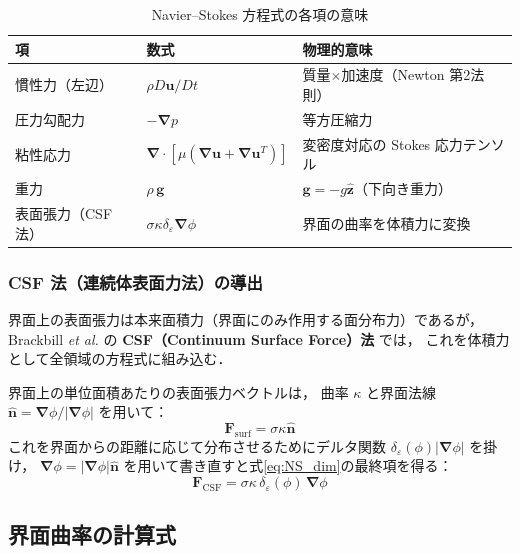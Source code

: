 \documentclass[12pt, a4paper, titlepage]{article}
\newcommand{\jp}[1]{{\normalfont\jpfont #1}}
\newcommand{\bu}{\bm{u}}
\newcommand{\bg}{\bm{g}}
\newcommand{\bnabla}{\bm{\nabla}}
\newcommand{\de}{\delta_\varepsilon}
\begin{document}
\begin{table}[h]
\centering
\caption{\jp{Navier--Stokes 方程式の各項の意味}}
\label{tab:NS_terms}
\begin{tabular}{lll}
\toprule
\jp{項} & \jp{数式} & \jp{物理的意味}\\
\midrule
\jp{慣性力（左辺）} & $\rho D\bu/Dt$ & \jp{質量}$\times$\jp{加速度（Newton 第2法則）}\\
\jp{圧力勾配力} & $-\bnabla p$ & \jp{等方圧縮力}\\
\jp{粘性応力} & $\bnabla\cdot[\mu(\bnabla\bu+\bnabla\bu^T)]$ & \jp{変密度対応の Stokes 応力テンソル}\\
\jp{重力} & $\rho\,\bg$ & \jp{$\bg = -g\hat{\bm{z}}$（下向き重力）}\\
\jp{表面張力（CSF法）} & $\sigma\kappa\de\bnabla\phi$ & \jp{界面の曲率を体積力に変換 \cite{Brackbill1992}}\\
\bottomrule
\end{tabular}
\end{table}

\subsubsection{CSF \jp{法（連続体表面力法）の導出}}

\jp{界面上の表面張力は本来面積力（界面にのみ作用する面分布力）であるが，
Brackbill \textit{et al.} \cite{Brackbill1992} の \textbf{CSF（Continuum Surface Force）法} では，
これを体積力として全領域の方程式に組み込む．}

\jp{界面上の単位面積あたりの表面張力ベクトルは，
曲率 $\kappa$ と界面法線 $\hat{\bm{n}} = \bnabla\phi/|\bnabla\phi|$ を用いて：}
\begin{equation}
  \bm{F}_{\mathrm{surf}} = \sigma\kappa\hat{\bm{n}}
\end{equation}
\jp{これを界面からの距離に応じて分布させるためにデルタ関数 $\de(\phi)|\bnabla\phi|$ を掛け，
$\bnabla\phi = |\bnabla\phi|\hat{\bm{n}}$ を用いて書き直すと式\eqref{eq:NS_dim}の最終項を得る：}
\begin{equation}
  \bm{F}_{\mathrm{CSF}} = \sigma\kappa\,\de(\phi)\,\bnabla\phi
\end{equation}

\subsection{\jp{界面曲率の計算式}}
\end{document}
